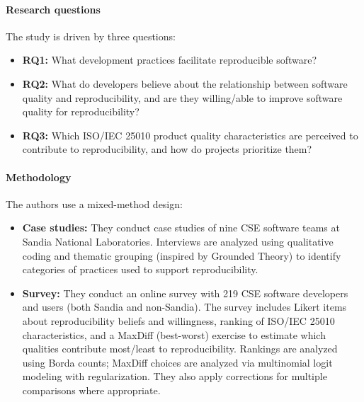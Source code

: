 \documentclass[11pt,a4paper]{article}
\begin{document}
\paragraph{Research questions}
The study is driven by three questions:
\begin{itemize}[leftmargin=*]
  \item \textbf{RQ1:} What development practices facilitate reproducible software?
  \item \textbf{RQ2:} What do developers believe about the relationship between software quality and reproducibility, and are they willing/able to improve software quality for reproducibility?
  \item \textbf{RQ3:} Which ISO/IEC 25010 product quality characteristics are perceived to contribute to reproducibility, and how do projects prioritize them?
\end{itemize}

\paragraph{Methodology}
The authors use a mixed-method design:
\begin{itemize}[leftmargin=*]
  \item \textbf{Case studies:} They conduct case studies of nine CSE software teams at Sandia National Laboratories. Interviews are analyzed using qualitative coding and thematic grouping (inspired by Grounded Theory) to identify categories of practices used to support reproducibility.
  \item \textbf{Survey:} They conduct an online survey with 219 CSE software developers and users (both Sandia and non-Sandia). The survey includes Likert items about reproducibility beliefs and willingness, ranking of ISO/IEC 25010 characteristics, and a MaxDiff (best-worst) exercise to estimate which qualities contribute most/least to reproducibility. Rankings are analyzed using Borda counts; MaxDiff choices are analyzed via multinomial logit modeling with regularization. They also apply corrections for multiple comparisons where appropriate.
\end{itemize}
\end{document}
